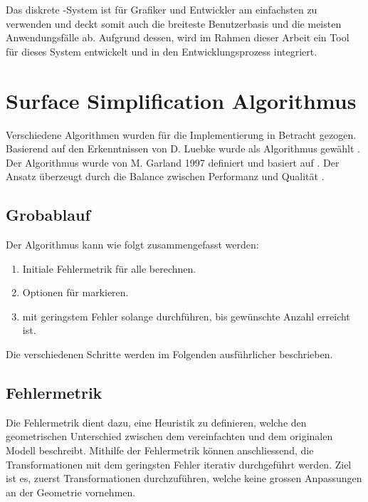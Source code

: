 Das diskrete -System ist für Grafiker und Entwickler am einfachsten zu verwenden und deckt somit auch die breiteste Benutzerbasis und die meisten Anwendungsfälle ab. Aufgrund dessen, wird im Rahmen dieser Arbeit ein Tool für dieses System entwickelt und in den Entwicklungsprozess integriert.

\section{Surface Simplification Algorithmus}
\label{chap:surfaceSimplificationAlgorithm}
Verschiedene Algorithmen wurden für die Implementierung in Betracht gezogen. Basierend auf den Erkenntnissen von D. Luebke wurde als Algorithmus  gewählt \cite{luebkeAlgorithmComparison}. Der Algorithmus wurde von M. Garland 1997 definiert und basiert auf . Der Ansatz überzeugt durch die Balance zwischen Performanz und Qualität \cite{surfaceSimplificationUsingQuadricErrorMetrices, surfaceSimplificationWithColorUsingQuadricErrorMetrices}.

\subsection{Grobablauf}
Der Algorithmus kann wie folgt zusammengefasst werden:

\begin{enumerate}
  \item Initiale Fehlermetrik für alle  berechnen.
  \item Optionen für  markieren.
  \item {} mit geringstem Fehler solange durchführen, bis gewünschte Anzahl  erreicht ist.
\end{enumerate}

Die verschiedenen Schritte werden im Folgenden ausführlicher beschrieben.

\subsection{Fehlermetrik}
Die Fehlermetrik dient dazu, eine Heuristik zu definieren, welche den geometrischen Unterschied zwischen dem vereinfachten und dem originalen Modell beschreibt. Mithilfe der Fehlermetrik können anschliessend, die Transformationen mit dem geringsten Fehler iterativ durchgeführt werden. Ziel ist es, zuerst Transformationen durchzuführen, welche keine grossen Anpassungen an der Geometrie vornehmen.

